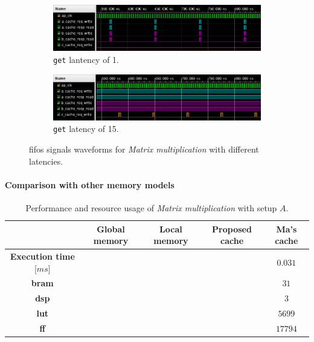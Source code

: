 \documentclass[11pt,a4paper,oneside]{memoir}
\begin{document}
\begin{figure}[!htb]
	\centering
	\begin{subfigure}[b]{\textwidth}
		\centering
		\includegraphics[width=\textwidth]{matmul_latency_1}
		\caption{\texttt{get} lantency of 1.}
		\label{subfig:matmul_wf_latency_1}
	\end{subfigure}
	\begin{subfigure}[b]{\textwidth}
		\centering
		\includegraphics[width=\textwidth]{matmul_latency_15}
		\caption{\texttt{get} latency of 15.}
		\label{subfig:matmul_wf_latency_15}
	\end{subfigure}
	\caption{\acp{fifo} signals waveforms for \emph{Matrix multiplication}
	with different latencies.}
	\label{fig:matmul_wf}
\end{figure}

\paragraph{Comparison with other memory models}
\begin{table}[!htb]
	\begin{center}
		\begin{tabularx}{\textwidth}{CCCCC}
			\hline
			& \textbf{Global memory} & \textbf{Local memory} &
			\textbf{Proposed cache} & \textbf{Ma's cache} \\
			\hline
			\textbf{Execution time} [$ms$] & & & & $0.031$ \\
			\textbf{\ac{bram}} & & & & $31$ \\
			\textbf{\acs{dsp}} & & & & $3$ \\
			\textbf{\acs{lut}} & & & & $5699$ \\
			\textbf{\acs{ff}} & & & & $17794$ \\
			\hline
		\end{tabularx}
	\end{center}
	\caption{Performance and resource usage of \emph{Matrix multiplication}
	with setup $A$.}
	\label{tab:matmul_report_a}
\end{table}
\end{document}
